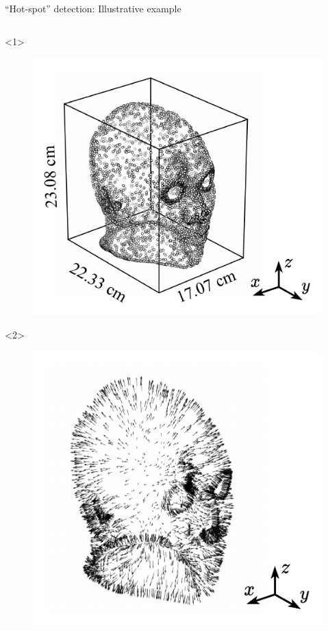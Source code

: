 \documentclass[xcolor=dvipsnames,10pt]{beamer}
\begin{document}
\begin{frame}{``Hot-spot'' detection: Illustrative example}
    \begin{columns}[c]
        \begin{column}{0.4\textwidth}
            \begin{onlyenv}<1>
                \begin{center}
                \begin{figure}
                    \includegraphics[width=\textwidth]{artwork/head.pcd.pdf}
                \end{figure}
                \end{center}
            \end{onlyenv}
            \begin{onlyenv}<2>
                \begin{center}
                \begin{figure}
                    \includegraphics[width=\textwidth]{artwork/head.n.pdf}

\end{figure}
\end{center}
\end{onlyenv}
\end{column}
\end{columns}
\end{frame}
\end{document}
